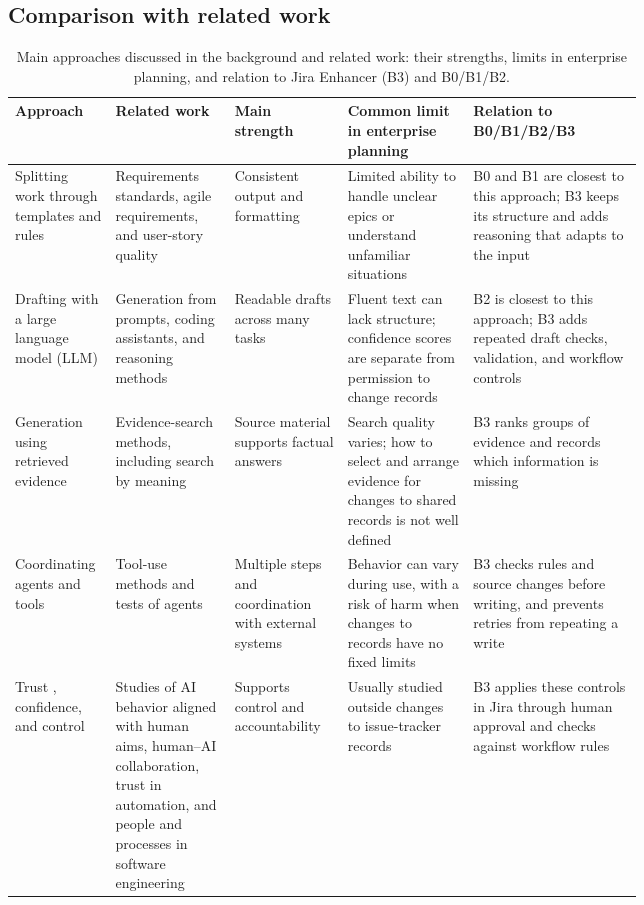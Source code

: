 \documentclass[10pt,a4paper]{article}
\begin{document}
\tableofcontents
\clearpage
\begin{landscape}
\section{Comparison with related work}
\begin{table}[H]
\centering
\setlength{\tabcolsep}{4pt}
\small
\caption{Main approaches discussed in the background and related work: their strengths, limits in enterprise planning, and relation to Jira Enhancer (B3) and B0/B1/B2.}
\label{tab:related-work-comparative}
\begin{tabularx}{\linewidth}{@{}>{\raggedright\arraybackslash}p{0.16\linewidth}>{\raggedright\arraybackslash}p{0.19\linewidth}>{\raggedright\arraybackslash}p{0.18\linewidth}>{\raggedright\arraybackslash}p{0.20\linewidth}>{\raggedright\arraybackslash}X@{}}
\toprule
Approach & Related work & Main strength & Common limit in enterprise planning & Relation to B0/B1/B2/B3 \\
\midrule
Splitting work through templates and rules & Requirements standards, agile requirements, and user-story quality \citep{R52,R62,R63} & Consistent output and formatting & Limited ability to handle unclear epics or understand unfamiliar situations & B0 and B1 are closest to this approach; B3 keeps its structure and adds reasoning that adapts to the input \\
Drafting with a large language model (LLM) & Generation from prompts, coding assistants, and reasoning methods \citep{R1,R14,R59,R77} & Readable drafts across many tasks & Fluent text can lack structure; confidence scores are separate from permission to change records & B2 is closest to this approach; B3 adds repeated draft checks, validation, and workflow controls \\
Generation using retrieved evidence & Evidence-search methods, including search by meaning \citep{R3,R5,R22} & Source material supports factual answers & Search quality varies; how to select and arrange evidence for changes to shared records is not well defined & B3 ranks groups of evidence and records which information is missing \\
Coordinating agents and tools & Tool-use methods and tests of agents \citep{R17,R27,R28,R92} & Multiple steps and coordination with external systems & Behavior can vary during use, with a risk of harm \citep{R87} when changes to records have no fixed limits & B3 checks rules and source changes before writing, and prevents retries from repeating a write \\
Trust \citep{R76}, confidence, and control & Studies of AI behavior aligned with human aims, human--AI collaboration, trust in automation, and people and processes in software engineering \citep{R13,R57,R75,R58} & Supports control and accountability \citep{R56} & Usually studied outside changes to issue-tracker records & B3 applies these controls in Jira through human approval and checks against workflow rules \\
\bottomrule
\end{tabularx}
\end{table}
\end{landscape}
\end{document}
